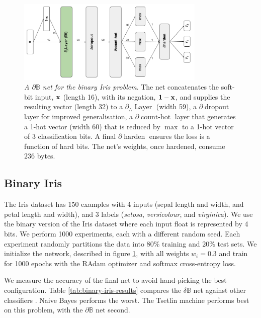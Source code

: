 \documentclass{article} %
\begin{document}
\begin{figure}[t!]
	\centering
	\includegraphics[width=0.8\textwidth]{binary-iris-architecture.png}
	\caption{{\em A $\partial\mathbb{B}$ net for the binary Iris problem}. The net concatenates the soft-bit input, ${\bf x}$ (length 16), with its negation, ${\bf 1 - x}$, and supplies the resulting vector (length 32) to a $\partial_{\wedge}\!\operatorname{Layer}$ (width 59), a $\partial\!\operatorname{dropout}$ layer for improved generalisation, a $\partial\!\operatorname{count-hot}$ layer that generates a 1-hot vector (width 60) that is reduced by $\operatorname{max}$ to a 1-hot vector of 3 classification bits. A final $\partial\!\operatorname{harden}$ ensures the loss is a function of hard bits. The net's weights, once hardened, consume $236$ bytes.}
	\label{fig:binary-iris-architecture}
\end{figure}

\subsection{Binary Iris}

The Iris dataset has 150 examples with 4 inputs (sepal length and width, and petal length and width), and 3 labels ({\em setosa}, {\em versicolour}, and {\em virginica}). We use the binary version of the Iris dataset \citep{binary-iris-dataset} where each input float is represented by 4 bits. We perform 1000 experiments, each with a different random seed. Each experiment randomly partitions the data into 80\% training and 20\% test sets. We initialize the network, described in figure \ref{fig:binary-iris-architecture}, with all weights $w_{i} = 0.3$ and train for 1000 epochs with the RAdam optimizer and softmax cross-entropy loss. 

We measure the accuracy of the final net to avoid hand-picking the best configuration. Table \ref{tab:binary-iris-results} compares the $\delta\mathbb{B}$ net against other classifiers  \citep{granmo18}. Naive Bayes performs the worst. The Tsetlin machine performs best on this problem, with the $\partial\mathbb{B}$ net second.
\end{document}
